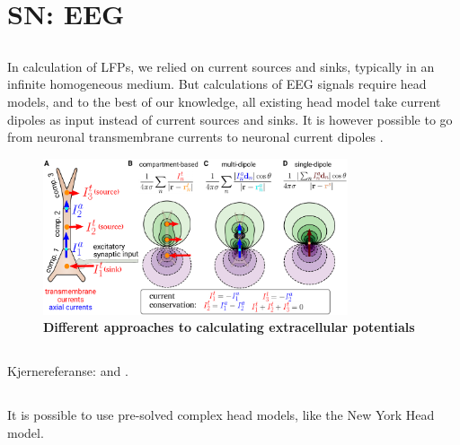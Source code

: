 \section{SN: EEG}
\label{sec:EEG}

\subsection{}
In calculation of LFPs, we relied on current sources and sinks, typically in an infinite homogeneous medium. But calculations of EEG signals require head models, and to the best of our knowledge, all existing head model take current dipoles as input instead of current sources and sinks. It is however possible to go from neuronal transmembrane currents to neuronal current dipoles \citep{Naess2020}.

\begin{figure}[!ht]
\begin{center}
\includegraphics[width=0.8\textwidth]{Figures/EEG/illustration_imem_iaxial.pdf}
\end{center}
\caption{\textbf{Different approaches to calculating extracellular potentials} 
}
\label{VC:fig:pointsource}
\end{figure}

\subsection{} 
Kjernereferanse: \citep{Naess2017} and \citep{Naess2020}.

\subsection{} 
It is possible to use pre-solved complex head models, like the New York Head model.

